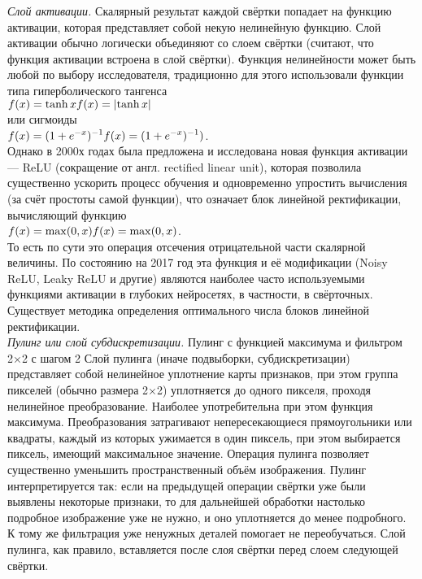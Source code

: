 \documentclass{article}
\begin{document}
\textit{Слой активации. }Скалярный результат каждой свёртки попадает на функцию активации, которая представляет собой некую нелинейную функцию. Слой активации обычно логически объединяют со слоем свёртки (считают, что функция активации встроена в слой свёртки). Функция нелинейности может быть любой по выбору исследователя, традиционно для этого использовали функции типа гиперболического тангенса\\ 
${\displaystyle{f(x) = {\tanh{x}}}} \\{\displaystyle{f(x) = |{\tanh{x}}|}}$ \\
или сигмоиды\\
${\displaystyle f(x)=(1+e^{-x})^{-1}} \\{\displaystyle f(x)=(1+e^{-x})^{-1}})$.\\ Однако в 2000х годах была предложена и исследована новая функция активации — ReLU (сокращение от англ. rectified linear unit), которая позволила существенно ускорить процесс обучения и одновременно упростить вычисления (за счёт простоты самой функции), что означает блок линейной ректификации, вычисляющий функцию \\${\displaystyle f(x)=\max(0,x)}\\{\displaystyle f(x)=\max(0,x)}$. \\То есть по сути это операция отсечения отрицательной части скалярной величины. По состоянию на 2017 год эта функция и её модификации (Noisy ReLU, Leaky ReLU и другие) являются наиболее часто используемыми функциями активации в глубоких нейросетях, в частности, в свёрточных. Существует методика определения оптимального числа блоков линейной ректификации. \\

\textit{Пулинг или слой субдискретизации. }Пулинг с функцией максимума и фильтром 2×2 с шагом 2
Слой пулинга (иначе подвыборки, субдискретизации) представляет собой нелинейное уплотнение карты признаков, при этом группа пикселей (обычно размера 2×2) уплотняется до одного пикселя, проходя нелинейное преобразование. Наиболее употребительна при этом функция максимума. Преобразования затрагивают непересекающиеся прямоугольники или квадраты, каждый из которых ужимается в один пиксель, при этом выбирается пиксель, имеющий максимальное значение. Операция пулинга позволяет существенно уменьшить пространственный объём изображения. Пулинг интерпретируется так: если на предыдущей операции свёртки уже были выявлены некоторые признаки, то для дальнейшей обработки настолько подробное изображение уже не нужно, и оно уплотняется до менее подробного. К тому же фильтрация уже ненужных деталей помогает не переобучаться. Слой пулинга, как правило, вставляется после слоя свёртки перед слоем следующей свёртки.
\end{document}
